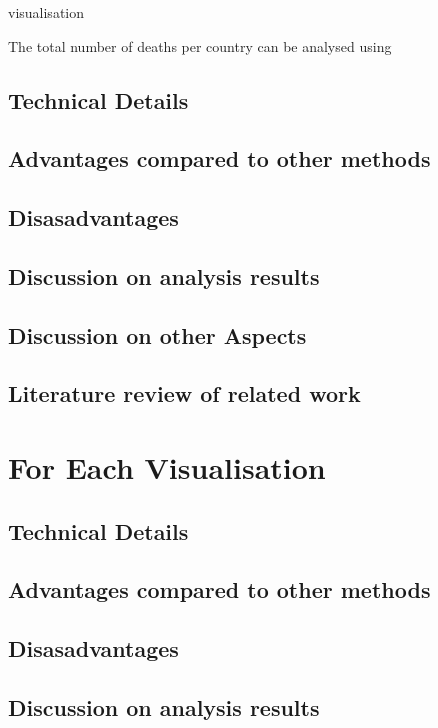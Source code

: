 \documentclass[11pt]{article}
\begin{document}
visualisation

The total number of deaths per country can be analysed using
\subsection{Technical Details}
\label{sec:orgda0a6ca}
\subsection{Advantages compared to other methods}
\label{sec:org62ec7d4}
\subsection{Disasadvantages}
\label{sec:orgd1d052a}
\subsection{Discussion on analysis results}
\label{sec:org6b274e8}
\subsection{Discussion on other Aspects}
\label{sec:org68719b3}
\subsection{Literature review of related work}
\label{sec:org99999c8}

\section{For Each Visualisation}
\label{sec:org51b751c}

\subsection{Technical Details}
\label{sec:orge59d4df}
\subsection{Advantages compared to other methods}
\label{sec:orgcf32daa}
\subsection{Disasadvantages}
\label{sec:org9c68d96}
\subsection{Discussion on analysis results}
\label{sec:org805633b}
\end{document}
